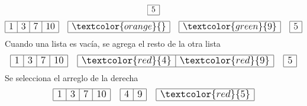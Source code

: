\documentclass{article}
\begin{document}
\begin{minipage}{0.5\textwidth}
\begin{equation*}
\begin{array}{|r|}
      \hline 5 \\ \hline
    \end{array}
  \end{equation*}
  \begin{equation*}
    \large
    \begin{array}{|r|r|r|r|}
      \hline 1 & 3 & 7 & 10 \\ \hline
    \end{array}\quad 
    \begin{array}{|r|}
      \hline \textcolor{orange}{} \\ \hline
    \end{array} \quad
    \begin{array}{|r|}
      \hline \textcolor{green}{9} \\ \hline
    \end{array}\quad 
    \begin{array}{|r|}
      \hline 5 \\ \hline
    \end{array}
  \end{equation*}
  Cuando una lista es vacía, se agrega el resto de la otra lista
  \begin{equation*}
    \large
    \begin{array}{|r|r|r|r|}
      \hline 1 & 3 & 7 & 10 \\ \hline
    \end{array}\quad 
    \begin{array}{|r|r|}
      \hline \textcolor{red}{4} & \textcolor{red}{9} \\ \hline
    \end{array} \quad
    \begin{array}{|r|}
      \hline 5 \\ \hline
    \end{array}
  \end{equation*}
  Se selecciona el arreglo de la derecha
  \begin{equation*}
    \large
    \begin{array}{|r|r|r|r|}
      \hline 1 & 3 & 7 & 10 \\ \hline
    \end{array}\quad 
    \begin{array}{|r|r|}
      \hline 4 & 9 \\ \hline
    \end{array} \quad
    \begin{array}{|r|}
      \hline \textcolor{red}{5} \\ \hline
    \end{array}

\end{equation*}
\end{minipage}
\end{document}
